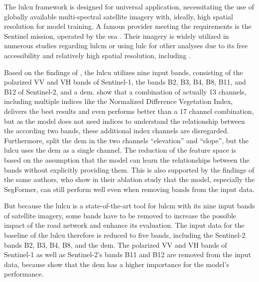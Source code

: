 The \gls{lulcu} framework is designed for universal application, necessitating the use of globally available multi-spectral satellite imagery with, ideally, high spatial resolution for model training. A famous provider meeting the requirements is the Sentinel mission, operated by the \gls{esa} \autocite{ESA2024}. Their imagery is widely utilized in numerous studies regarding \gls{lulcm} or using \gls{lulc} for other analyses due to its free accessibility and relatively high spatial resolution, including \textcite{Ludwig.Hecht.ea2021,ThanhNoi.Kappas2018,Zong.He.ea2020}.

Based on the findings of \textcite{Tzepkenlis.Marthoglou.ea2023}, the \gls{lulcu} utilizes nine input bands, consisting of the polarized VV and VH bands of Sentinel-1, the bands B2, B3, B4, B8, B11, and B12 of Sentinel-2, and a \gls{dem}. \textcite{Tzepkenlis.Marthoglou.ea2023} show that a combination of actually 13 channels, including multiple indices like the Normalized Difference Vegetation Index, delivers the best results and even performs better than a 17 channel combination, but as the model does not need indices to understand the relationship between the according two bands, these additional index channels are disregarded. Furthermore, \textcite{Tzepkenlis.Marthoglou.ea2023} split the \gls{dem} in the two channels \enquote{elevation} and \enquote{slope}, but the \gls{lulcu} uses the \gls{dem} as a single channel. The reduction of the feature space is based on the assumption that the model can learn the relationships between the bands without explicitly providing them. This is also supported by the findings of the same authors, who show in their ablation study that the model, especially the SegFormer, can still perform well even when removing bands from the input data.

But because the \gls{lulcu} is a state-of-the-art tool for \gls{lulcm} with its nine input bands of satellite imagery, some bands have to be removed to increase the possible impact of the road network and enhance its evaluation. The input data for the baseline of the \gls{lulcu} therefore is reduced to five bands, including the Sentinel-2 bands B2, B3, B4, B8, and the \gls{dem}. The polarized VV and VH bands of Sentinel-1 as well as Sentinel-2's bands B11 and B12 are removed from the input data, because \textcite{Tzepkenlis.Marthoglou.ea2023} show that the \gls{dem} has a higher importance for the model's performance.

